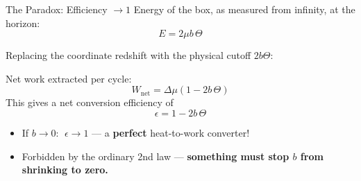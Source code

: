 \documentclass[aspectratio=169]{beamer}
\begin{document}
\begin{frame}{The Paradox: Efficiency $\to 1$}
Energy of the box, as measured from infinity, at the horizon:
\[
E = 2\mu b\,\Theta
\]

Replacing the coordinate redshift with the physical cutoff $2b\Theta$:

\vspace{0.2cm}
Net work extracted per cycle:
\[
W_{\text{net}} = \Delta\mu(1 - 2b\,\Theta)
\]
This gives a net conversion efficiency of
\[
\boxed{\epsilon = 1-2b\,\Theta}
\]
\begin{itemize}
    \item If $b\to 0$: $\;\epsilon \to 1$ — a \textbf{perfect} heat-to-work converter!
    \item Forbidden by the ordinary 2nd law — \textbf{something must stop $b$ from shrinking to zero.}
\end{itemize}
\end{frame}
\end{document}
